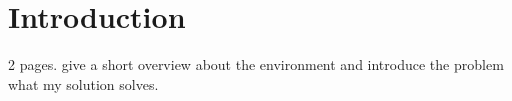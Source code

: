 \chapter{Introduction}
2 pages. give a short overview about the environment and introduce the problem what my solution solves. 
